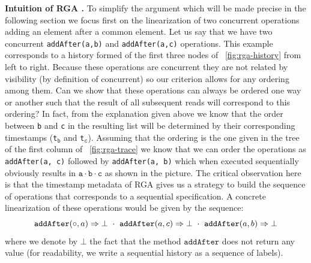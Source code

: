 \smallskip
\noindent
{\bf Intuition of RGA \CRDTLinshort{}.}
To simplify the argument which will be made precise in the following
section we focus first on the linearization of two concurrent
operations adding an element after a common element.
%
Let us say that we have two concurrent \lstinline|addAfter(a,b)| and
\lstinline|addAfter(a,c)| operations.
%
This example corresponds to a history formed of the first three nodes
of \figureautorefname~\ref{fig:rga-history} from left to right.
%
Because these operations are concurrent they are not related by
visibility (by definition of concurrent) so our criterion allows for
any ordering among them.
%
Can we show that these operations can always be ordered one way or
another such that the result of all subsequent reads will correspond
to this ordering?
%
In fact, from the explanation given above we know that the order
between \lstinline|b| and \lstinline|c| in the resulting list will be
determined by their corresponding timestamps
(\lstinline|t|$_{\mathtt{b}}$ and \lstinline|t|$_{\mathtt{c}}$).
%
Assuming that the ordering is the one given in the tree of the first
column of \figureautorefname~\ref{fig:rga-trace} we know that we can order the
operations as \lstinline|addAfter(a, c)| followed by
\lstinline|addAfter(a, b)| which when executed sequentially obviously
results in $\mathtt{a \cdot b \cdot c}$ as shown in the picture.
%
The critical observation here is that the timestamp metadata of RGA
gives us a strategy to build the sequence of operations that
corresponds to a sequential specification.
%
A concrete linearization of these operations would be given by the
sequence:
\[\alabellong[\mathtt{addAfter}]{\circ,a}{\bot}\ \cdot\
\alabellong[\mathtt{addAfter}]{a,c}{\bot}\ \cdot\
\alabellong[\mathtt{addAfter}]{a,b}{\bot}
\]
where we denote by $\bot$ the fact that the method $\mathtt{addAfter}$
does not return any value (for readability, we write a sequential history as a sequence of labels).
%

